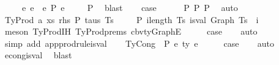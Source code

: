 \begin{isabellebody}
\ \ \ \ \ {\isasymexists}e{\isacharprime}{\kern0pt}{\isachardot}{\kern0pt}\ e{}\ {\isasymcdot}\ e{}\ {\isacharminus}{\kern0pt}{\isachargreater}{\kern0pt}{\isacharbraceleft}{\kern0pt}P{\isacharbraceright}{\kern0pt}\ e{\isacharprime}{\kern0pt}{\isachardoublequoteclose}\isanewline
\ \ \ \isamarkupfalse%
\ P{}\ \isamarkupfalse%
\ blast\isanewline
\isanewline
\ \ \isamarkupfalse%
\ {\isacharquery}{\kern0pt}case\isanewline
\ \ \ \ \isamarkupfalse%
\ P{}\ P{}\ P{}\ \isamarkupfalse%
\ auto\isanewline
{}\isamarkupfalse%
\isanewline
\ \ \isamarkupfalse%
\ {\isacharparenleft}{\kern0pt}TyProd\ a\ xs\ rhs\ P\ taus\ Ts\ {\isasymGamma}{\isacharparenright}{\kern0pt}\isanewline
\ \ \isamarkupfalse%
\ P{}{\isacharcolon}{\kern0pt}\ {\isachardoublequoteopen}{\isasymforall}i{\isacharless}{\kern0pt}length\ Ts{\isachardot}{\kern0pt}\ is{\isacharunderscore}{\kern0pt}val\ {\isacharparenleft}{\kern0pt}Graph\ {\isacharparenleft}{\kern0pt}Ts\ {\isacharbang}{\kern0pt}\ i{\isacharparenright}{\kern0pt}{\isacharparenright}{\kern0pt}{\isachardoublequoteclose}\isanewline
\ \ \ \ \isamarkupfalse%
\ {\isacharparenleft}{\kern0pt}meson\ TyProd{\isachardot}{\kern0pt}IH\ TyProd{\isachardot}{\kern0pt}prems\ cbv{\isacharunderscore}{\kern0pt}ty{\isacharunderscore}{\kern0pt}GraphE{\isacharparenright}{\kern0pt}\isanewline
\ \ \isamarkupfalse%
\ \isamarkupfalse%
\ {\isacharquery}{\kern0pt}case\isanewline
\ \ \isamarkupfalse%
\ auto\isanewline
\ \ \isamarkupfalse%
\ {\isacharparenleft}{\kern0pt}simp\ add{\isacharcolon}{\kern0pt}\ app{\isacharunderscore}{\kern0pt}prodrule{\isacharunderscore}{\kern0pt}is{\isacharunderscore}{\kern0pt}val{\isacharparenright}{\kern0pt}\isanewline
{}\isamarkupfalse%
\isanewline
\ \ \isamarkupfalse%
\ {\isacharparenleft}{\kern0pt}TyCong\ {\isasymGamma}\ P\ e{}\ ty\ e{}{\isacharparenright}{\kern0pt}\isanewline
\ \ \isamarkupfalse%
\ \isamarkupfalse%
\ {\isacharquery}{\kern0pt}case\isanewline
\ \ \isamarkupfalse%
\ auto\isanewline
\ \ \isamarkupfalse%
\ econg{\isacharunderscore}{\kern0pt}is{\isacharunderscore}{\kern0pt}val\ \isamarkupfalse%
\ blast\isanewline
\ \ \isamarkupfalse%

\end{isabellebody}
